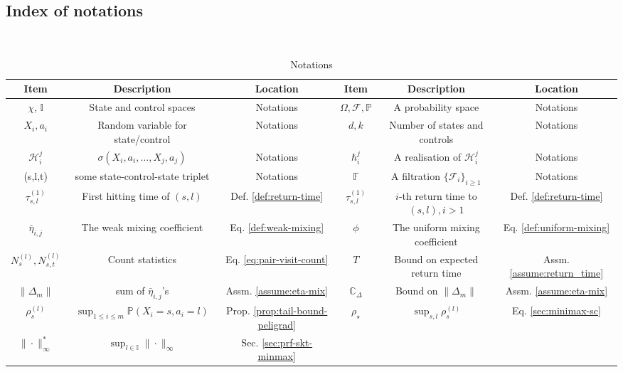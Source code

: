 \documentclass[opre,sglanonrev]{informs4}
\numberwithin{equation}{section}
\newcommand{\pow}[1]{^{(#1)}}
\newcommand{\history}{\hbar}
\newcommand{\Cbb}{\mathbb{C}}
\newcommand{\Fbb}{\mathbb{F}}
\newcommand{\Ibb}{\mathbb{I}}
\newcommand{\Pbb}{\mathbb{P}}
\newcommand{\Fcal}{\mathcal{F}}
\newcommand{\Hcal}{\mathcal{H}}
\newcommand{\constant}{\Cbb}
\newcommand{\prob}{\Pbb}
\begin{document}
\begin{APPENDICES}
\section{Index of notations}
\ 
\begin{table}[!ht]
    \centering
    \begin{tabular}{c|c|c|c|c|c}
            \hline
            Item & Description & Location & Item & Description & Location\\
            \hline
            $\chi$, $ \Ibb$& State and control spaces & Notations & $\Omega,\Fcal,\prob$ & A probability space  & Notations\\
            $X_i,a_i$ & Random variable for state/control & Notations& $d,k$ & Number of states and controls & Notations \\
            $\Hcal_i^j$ & $\sigma(X_i,a_i,\dots, X_j,a_j)$ & Notations & $\history_i^j$& A realisation of $\Hcal_i^j$ & Notations\\
            (s,l,t)& some state-control-state triplet & Notations & $\Fbb$& A filtration $\{\Fcal_i\}_{i\geq 1}$ & Notations\\
            $\tau_{s,l}\pow 1$ & First hitting time of $(s,l)$ & Def. \ref{def:return-time} & $\tau_{s,l}\pow 1$& $i$-th return time to $(s,l),i>1$& Def. \ref{def:return-time} \\ 
            $\bar \eta_{i,j}$ & The weak mixing coefficient & Eq. \ref{def:weak-mixing} & $\phi$ & The uniform mixing coefficient & Eq. \ref{def:uniform-mixing}\\
            $N_s\pow l, N_{s,t}\pow l$ & Count statistics & Eq. \ref{eq:pair-visit-count} & $T$ & Bound on expected return time & Assm. \ref{assume:return_time}\\
            $\|\Delta_m\|$ & sum of $\bar\eta_{i,j}$'s & Assm. \ref{assume:eta-mix} & $\constant_\Delta$ & Bound on $\|\Delta_m\|$ & Assm. \ref{assume:eta-mix} \\
            $\rho_s\pow l$ & $\sup_{1\leq i\leq m}\prob(X_i=s,a_i=l)$ & Prop. \ref{prop:tail-bound-peligrad}& $\rho_\star$& $\sup_{s,l} \rho_{s}\pow l$ & Eq. \ref{sec:minimax-sc}\\
            $\|\cdot\|_\infty^*$ & $\sup_{l\in\Ibb} \| \cdot \|_\infty$ & Sec. \ref{sec:prf-skt-minmax} & & &\\
            \hline
    \end{tabular}
    \caption{Notations}
    \label{tab:index}
\end{table}




\end{APPENDICES}
\end{document}
